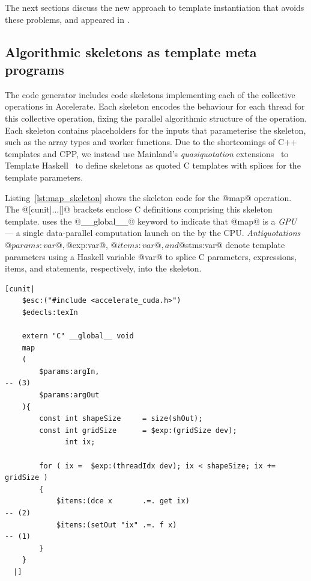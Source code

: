 The next sections discuss the new approach to template instantiation that avoids
these problems, and appeared in \cite{CliftonEverest:2014vi}.


\subsection{Algorithmic skeletons as template meta programs}

The code generator includes \CUDA code skeletons implementing each of the
collective operations in Accelerate. Each skeleton encodes the behaviour for
each thread for this collective operation, fixing the parallel algorithmic
structure of the operation. Each skeleton contains placeholders for the inputs
that parameterise the skeleton, such as the array types and worker functions.
Due to the shortcomings of C++ templates and CPP, we instead use Mainland's
\emph{quasiquotation} extensions~\cite{Mainland:2007bl} to Template
Haskell~\cite{Sheard:2002wu} to define skeletons as quoted \CUDA C templates
with splices for the template parameters.

Listing~\ref{lst:map_skeleton} shows the skeleton code for the @map@
operation. The @[cunit|...|]@ brackets enclose \CUDA C definitions
comprising this skeleton template. \CUDA uses the @__global__@ keyword to
indicate that @map@ is a \emph{GPU} ~\cite{NVIDIA:2012wf}
--- a single data-parallel computation launch on the \GPU by the CPU.
\emph{Antiquotations} @$params:var@, @$exp:var@,
@$items:var@, and @$stms:var@ denote template parameters using a
Haskell variable @var@ to splice \CUDA C parameters, expressions, items,
and statements, respectively, into the skeleton.

\begin{lstlisting}[style=haskell,
    float,
    name=map_skeleton,
    label=lst:map_skeleton,
    caption={Accelerate CUDA skeleton for the @map@ operation}]
[cunit|
    $esc:("#include <accelerate_cuda.h>")
    $edecls:texIn

    extern "C" __global__ void
    map
    (
        $params:argIn,                                                                 -- (3)
        $params:argOut
    ){
        const int shapeSize     = size(shOut);
        const int gridSize      = $exp:(gridSize dev);
              int ix;

        for ( ix =  $exp:(threadIdx dev); ix < shapeSize; ix += gridSize )
        {
            $items:(dce x       .=. get ix)                                            -- (2)
            $items:(setOut "ix" .=. f x)                                               -- (1)
        }
    }
  |]
\end{lstlisting}

